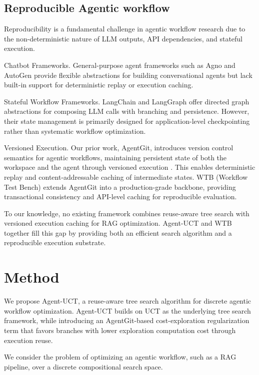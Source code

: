 \documentclass{article}
\begin{document}
\subsection{Reproducible Agentic workflow}

    Reproducibility is a fundamental challenge in agentic workflow research due to the non-deterministic nature of LLM outputs, API dependencies, and stateful execution.

    Chatbot Frameworks. General-purpose agent frameworks such as Agno and AutoGen \citep{wu2024autogen} provide flexible abstractions for building conversational agents but lack built-in support for deterministic replay or execution caching.

    Stateful Workflow Frameworks. LangChain and LangGraph offer directed graph abstractions for composing LLM calls with branching and persistence. However, their state management is primarily designed for application-level checkpointing rather than systematic workflow optimization.

    Versioned Execution. Our prior work, AgentGit, introduces version control semantics for agentic workflows, maintaining persistent state of both the workspace and the agent through versioned execution \citep{li2025agentgit}. This enables deterministic replay and content-addressable caching of intermediate states. WTB (Workflow Test Bench) extends AgentGit into a production-grade backbone, providing transactional consistency and API-level caching for reproducible evaluation.

    To our knowledge, no existing framework combines reuse-aware tree search with versioned execution caching for RAG optimization. Agent-UCT and WTB together fill this gap by providing both an efficient search algorithm and a reproducible execution substrate.


\section{Method}

We propose Agent-UCT, a reuse-aware tree search algorithm for discrete agentic workflow optimization. Agent-UCT builds on UCT as the underlying tree search framework, while introducing an AgentGit-based cost-exploration regularization term that favors branches with lower exploration computation cost through execution reuse.

We consider the problem of optimizing an agentic workflow, such as a RAG pipeline, over a discrete compositional search space.
\end{document}
